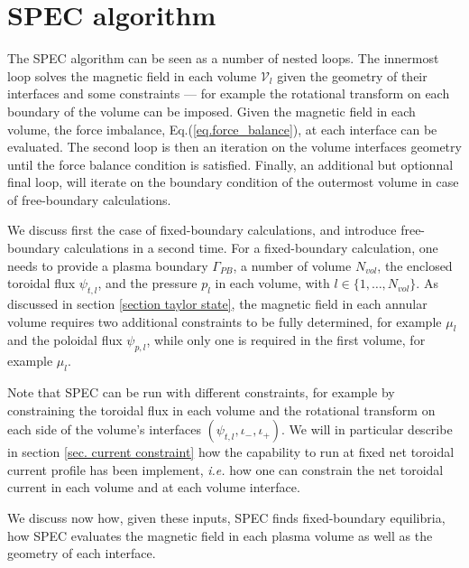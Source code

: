 \documentclass[my_thesis.tex]{subfiles}
\begin{document}
\section{SPEC algorithm \label{sec. spec_algorithm}} 
The SPEC algorithm can be seen as a number of nested loops. The innermost loop solves the magnetic field in each volume $\mathcal{V}_l$ given the geometry of their interfaces and some constraints --- for example the rotational transform on each boundary of the volume can be imposed. Given the magnetic field in each volume, the force imbalance, Eq.(\ref{eq.force_balance}), at each interface can be evaluated. The second loop is then an iteration on the volume interfaces geometry until the force balance condition is satisfied. Finally, an additional but optionnal final loop, will iterate on the boundary condition of the outermost volume in case of free-boundary calculations.

We discuss first the case of fixed-boundary calculations, and introduce free-boundary calculations in a second time. For a fixed-boundary calculation, one needs to provide a plasma boundary $\Gamma_{PB}$, a number of volume $N_{vol}$, the enclosed toroidal flux $\psi_{t,l}$, and the pressure $p_l$ in each volume, with $l\in\{1,\ldots,N_{vol}\}$. As discussed in section \ref{section taylor state}, the magnetic field in each annular volume requires two additional constraints to be fully determined, for example $\mu_l$ and the poloidal flux $\psi_{p,l}$, while only one is required in the first volume, for example $\mu_l$. 

Note that \ac{SPEC} can be run with different constraints, for example by constraining the toroidal flux in each volume and the rotational transform on each side of the volume's interfaces $(\psi_{t,l},\iota_-,\iota_+)$. We will in particular describe in section \ref{sec. current constraint} how the capability to run at fixed net toroidal current profile has been implement, \textit{i.e.} how one can constrain the net toroidal current in each volume and at each volume interface.

We discuss now how, given these inputs, SPEC finds fixed-boundary equilibria, how SPEC evaluates the magnetic field in each plasma volume as well as the geometry of each interface.
\end{document}
